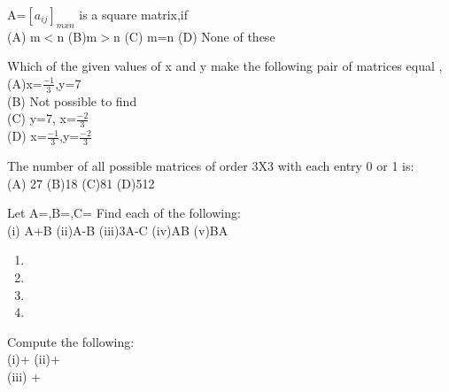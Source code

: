 

\item A=$[a_{ij}]_{mxn}$ is a square matrix,if\\
(A) m$<$n (B)m$>$n (C) m=n (D) None of these\\
\item Which of the given values of x and y make the following pair of matrices equal ,\\
(A)x=$\frac{-1}{3}$,y=7 \\
 (B) Not possible to find\\
(C) y=7, x=$\frac{-2}{3}$\\
 (D) x=$\frac{-1}{3}$,y=$\frac{-2}{3}$\\
\item The number of all possible matrices of order 3X3 with each entry 0 or 1 is:\\
(A) 27 (B)18 (C)81 (D)512\\
\item Let A=,B=,C=
Find each of the following:\\
(i) A+B  (ii)A-B  (iii)3A-C  (iv)AB  (v)BA\\
\solution
\begin{enumerate}
  \item 
  \item
  \item
  \item
\end{enumerate}
\item Compute the following:\\
(i)+ (ii)+ \\
  (iii) +\\ 
